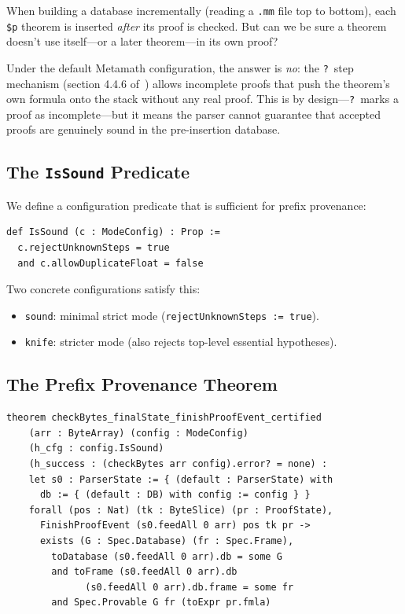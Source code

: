 \documentclass[11pt]{article}
\newcommand{\lean}[1]{\lstinline[language=Lean4]{#1}}
\newcommand{\file}[1]{\texttt{#1}}
\begin{document}
When building a database incrementally (reading a \texttt{.mm} file
top to bottom), each \texttt{\$p} theorem is inserted \emph{after} its
proof is checked.  But can we be sure a theorem doesn't use itself---or
a later theorem---in its own proof?

Under the default Metamath configuration, the answer is \emph{no}:
the \texttt{?}~step mechanism (section 4.4.6 of~\cite{megill2019})
allows incomplete proofs that push the theorem's own formula onto the
stack without any real proof.  This is by design---\texttt{?}~marks
a proof as incomplete---but it means the parser cannot guarantee that
accepted proofs are genuinely sound in the pre-insertion database.

\subsection{The \texttt{IsSound} Predicate}

We define a configuration predicate that is sufficient for prefix
provenance:

\begin{lstlisting}[caption={\lean{IsSound} (\file{Verify.lean}).},label=lst:prefix-cfg]
def IsSound (c : ModeConfig) : Prop :=
  c.rejectUnknownSteps = true
  and c.allowDuplicateFloat = false
\end{lstlisting}

Two concrete configurations satisfy this:
\begin{itemize}[leftmargin=2em]
\item \lean{sound}: minimal strict mode (\lean{rejectUnknownSteps := true}).
\item \lean{knife}: stricter mode (also rejects top-level essential hypotheses).
\end{itemize}

\subsection{The Prefix Provenance Theorem}

\begin{lstlisting}[caption={Prefix provenance (\file{PrefixProvability/Checker.lean}).},label=lst:prefix]
theorem checkBytes_finalState_finishProofEvent_certified
    (arr : ByteArray) (config : ModeConfig)
    (h_cfg : config.IsSound)
    (h_success : (checkBytes arr config).error? = none) :
    let s0 : ParserState := { (default : ParserState) with
      db := { (default : DB) with config := config } }
    forall (pos : Nat) (tk : ByteSlice) (pr : ProofState),
      FinishProofEvent (s0.feedAll 0 arr) pos tk pr ->
      exists (G : Spec.Database) (fr : Spec.Frame),
        toDatabase (s0.feedAll 0 arr).db = some G
        and toFrame (s0.feedAll 0 arr).db
              (s0.feedAll 0 arr).db.frame = some fr
        and Spec.Provable G fr (toExpr pr.fmla)
\end{lstlisting}
\end{document}
